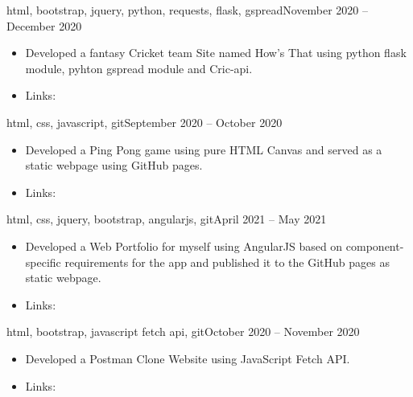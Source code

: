 \documentclass[10pt,a4paper]{altacv}
\begin{document}


{\MakeLowercase{html, Bootstrap, jquery, Python, requests, flask, gspread}}{November 2020 -- December 2020}{}
\begin{itemize}
\item Developed a fantasy Cricket team Site named How's That using python flask module, pyhton gspread module and Cric-api.
\item Links: 
\end{itemize}
\divider

{\MakeLowercase{HTML, CSS, JavaScript, Git}}{September 2020 -- October 2020}{}
\begin{itemize}
\item Developed a Ping Pong game using pure HTML Canvas and served as a static webpage using GitHub pages.
\item Links: 
\end{itemize}
\divider

{\MakeLowercase{HTML, CSS, jQuery, Bootstrap, AngularJS, Git}}{April 2021 -- May 2021}{}
\begin{itemize}
\item Developed a Web Portfolio for myself using AngularJS based on component-specific requirements for the app and published it to the GitHub pages as static webpage.
\item Links: 
\end{itemize}
\divider



{\MakeLowercase{HTML, Bootstrap, javaScript fetch api, Git}}{October 2020 -- November 2020}{}
\begin{itemize}
\item Developed a Postman Clone Website using JavaScript Fetch API.
\item Links: 
\end{itemize}
\divider
\end{document}
